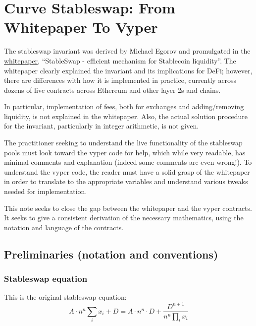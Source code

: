 \documentclass[
]{article}
\date{}
\begin{document}
\hypertarget{curve-stableswap-from-whitepaper-to-vyper}{%
\section{Curve Stableswap: From Whitepaper To
Vyper}\label{curve-stableswap-from-whitepaper-to-vyper}}

The stableswap invariant was derived by Michael Egorov and promulgated
in the \href{https://curve.fi/files/stableswap-paper.pdf}{whitepaper},
``StableSwap - efficient mechanism for Stablecoin liquidity''. The
whitepaper clearly explained the invariant and its implications for
DeFi; however, there are differences with how it is implemented in
practice, currently across dozens of live contracts across Ethereum and
other layer 2s and chains.

In particular, implementation of fees, both for exchanges and
adding/removing liquidity, is not explained in the whitepaper. Also, the
actual solution procedure for the invariant, particularly in integer
arithmetic, is not given.

The practitioner seeking to understand the live functionality of the
stableswap pools must look toward the vyper code for help, which while
very readable, has minimal comments and explanation (indeed some
comments are even wrong!). To understand the vyper code, the reader must
have a solid grasp of the whitepaper in order to translate to the
appropriate variables and understand various tweaks needed for
implementation.

This note seeks to close the gap between the whitepaper and the vyper
contracts. It seeks to give a consistent derivation of the necessary
mathematics, using the notation and language of the contracts.

\hypertarget{preliminaries-notation-and-conventions}{%
\subsection{Preliminaries (notation and
conventions)}\label{preliminaries-notation-and-conventions}}

\hypertarget{stableswap-equation}{%
\subsubsection{Stableswap equation}\label{stableswap-equation}}

This is the original stableswap equation:
\[ A \cdot n^n  \sum_i x_i + D = A \cdot n^n \cdot D + \frac{D^{n+1}}{n^n \prod_i x_i}\]
\end{document}
